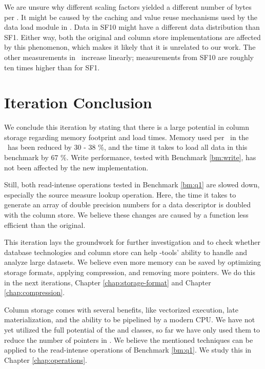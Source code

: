 We are unsure why different scaling factors yielded a different number of bytes per \lineitem. It might be caused by the caching and value reuse mechanisms used by the data load module in \gap. Data in SF10 might have a different data distribution than SF1. Either way, both the original and column store implementations are affected by this phenomenon, which makes it likely that it is unrelated to our work. The other measurements in \tpchdl~increase linearly; measurements from SF10 are roughly ten times higher than for SF1. 

\section{Iteration Conclusion}
\label{sec:Iteration Conclusion}
We conclude this iteration by stating that there is a large potential in column storage regarding memory footprint and load times. Memory used per \lineitem~in the \tpchdl~has been reduced by 30 - 38 \%, and the time it takes to load all data in this benchmark by 67 \%. Write performance, tested with Benchmark \ref{bm:write}, has not been affected by the new implementation.

Still, both read-intense operations tested in Benchmark \ref{bm:q1} are slowed down, especially the source measure lookup operation. Here, the time it takes to generate an array of double precision numbers for a data descriptor is doubled with the column store. We believe these changes are caused by a  function less efficient than the original.

This iteration lays the groundwork for further investigation and to check whether database technologies and column store can help \mdd-tools' ability to handle and analyze large datasets. We believe even more memory can be saved by optimizing storage formats, applying compression, and removing more pointers. We do this in the next iterations, Chapter \ref{chap:storage-format} and Chapter \ref{chap:compression}. 

Column storage comes with several benefits, like vectorized execution, late materialization, and the ability to be pipelined by a modern CPU. We have not yet utilized the full potential of the  and  classes, so far we have only used them to reduce the number of pointers in \gap. We believe the mentioned techniques can be applied to the read-intense operations of Benchmark \ref{bm:q1}. We study this in Chapter \ref{chap:operations}.

